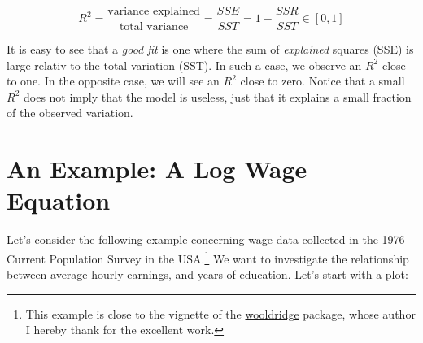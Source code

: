 \documentclass[]{book}
\let\rmarkdownfootnote\footnote%
\def\footnote{\protect\rmarkdownfootnote}
\begin{document}
\begin{equation}
R^2 = \frac{\text{variance explained}}{\text{total variance}} = \frac{SSE}{SST} = 1 - \frac{SSR}{SST}\in[0,1]  \label{eq:Rsquared}
\end{equation}

It is easy to see that a \emph{good fit} is one where the sum of \emph{explained} squares (SSE) is large relativ to the total variation (SST). In such a case, we observe an \(R^2\) close to one. In the opposite case, we will see an \(R^2\) close to zero. Notice that a small \(R^2\) does not imply that the model is useless, just that it explains a small fraction of the observed variation.

\hypertarget{an-example-a-log-wage-equation}{%
\section{An Example: A Log Wage Equation}\label{an-example-a-log-wage-equation}}

Let's consider the following example concerning wage data collected in the 1976 Current Population Survey in the USA.\footnote{This example is close to the vignette of the \href{https://cloud.r-project.org/web/packages/wooldridge/index.html}{wooldridge} package, whose author I hereby thank for the excellent work.} We want to investigate the relationship between average hourly earnings, and years of education. Let's start with a plot:
\end{document}
